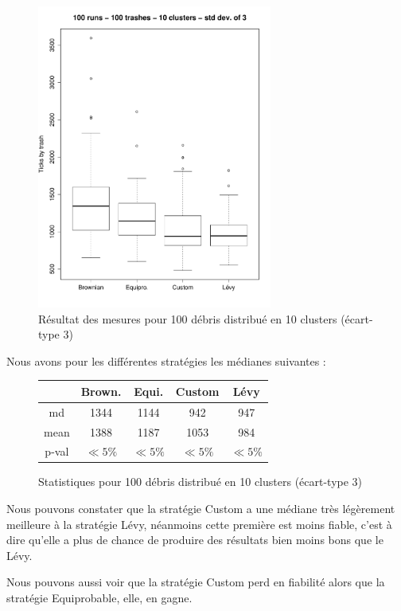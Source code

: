 

\begin{figure}[H]
	\begin{center}
		\includegraphics[height=10cm]{diagrams/100Tr10Clts_all.pdf}
		\caption{Résultat des mesures pour 100 débris distribué en 10 clusters (écart-type 3)}
		\label{fig:100Trashes_10Clusters}
	\end{center}
\end{figure}

Nous avons pour les différentes stratégies les médianes suivantes :

\begin{figure}[H]
	\begin{center}
		\begin{tabular}{| c || c | c | c | c | }
			\hline
			&Brown.&Equi.&Custom&Lévy \\
			\hline
			\hline
			md&1344&1144&942&947\\
			mean&1388&1187&1053&984\\
			p-val&$\ll 5\%$&$\ll 5\%$&$\ll 5\%$&$\ll 5\%$\\
			\hline
		\end{tabular}
		\caption{Statistiques pour 100 débris distribué en 10 clusters (écart-type 3)}
	\end{center}
\end{figure}


Nous pouvons constater que la stratégie Custom a une médiane très
légèrement meilleure à la stratégie Lévy, néanmoins cette première
est moins fiable, c'est à dire qu'elle a plus de chance de produire
des résultats bien moins bons que le Lévy.

Nous pouvons aussi voir que la stratégie Custom perd en fiabilité
alors que la stratégie Equiprobable, elle, en gagne.